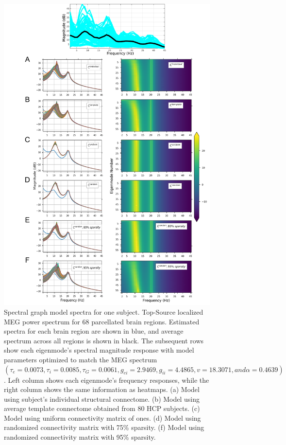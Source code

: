 \begin{figure}[htbp]
    \centering
    \includegraphics[scale=0.81]{../figures/chapter5/fig2_conn_spectra.png}
    \caption{Spectral graph model spectra for one subject. Top-Source localized MEG power spectrum for 68 parcellated brain regions. Estimated spectra for each brain region are shown in blue, and average spectrum across all regions is shown in black. The subsequent rows show each eigenmode's spectral magnitude response with model parameters optimized to match the MEG spectrum $(\tau_e = 0.0073, \tau_i = 0.0085, \tau_G = 0.0061, g_{ei} = 2.9469, g_{ii} = 4.4865, v = 18.3071, and \alpha = 0.4639)$. Left column shows each eigenmode's frequency responses, while the right column shows the same information as heatmaps. (a) Model using  subject's individual structural connectome. (b) Model using average template connectome obtained from 80 HCP subjects. (c) Model using uniform connectivity matrix of ones. (d) Model using randomized connectivity matrix with 75\% sparsity. (f) Model using randomized connectivity matrix with 95\% sparsity.}
    \label{fig:conn_spectra}
\end{figure}

